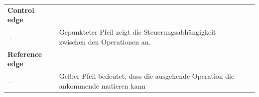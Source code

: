\begin{tabular}{ p{4cm}p{10.8cm} ll }
\textbf{Control edge} \tabularnewline 
\includegraphics[width=0.1\textwidth]{images/Kapitel_3/Control_dependency_edge.png}
\label{fig:Control_dependendy_edge}
 & Gepunkteter Pfeil zeigt die Steuerungsabhängigkeit zwischen den Operationen an.  \tabularnewline 
 
\textbf{Reference edge} \tabularnewline 
\includegraphics[width=0.1\textwidth]{images/Kapitel_3/Reference_edge.png}
\label{fig:Reference_edge}
 & Gelber Pfeil bedeutet, dass die ausgehende Operation die ankommende mutieren kann   \tabularnewline 
\end{tabular}
\\
